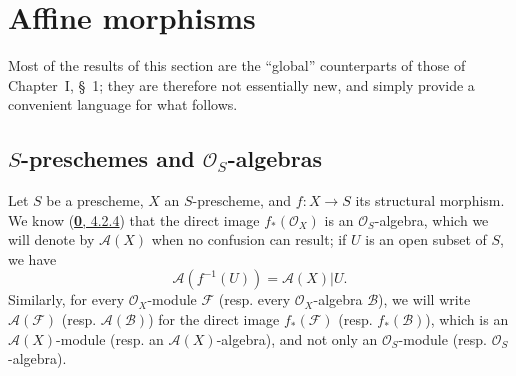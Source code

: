 \section{Affine morphisms}
\label{section:II.1}

Most of the results of this section are the ``global''
counterparts of those of Chapter~I, \S~1; they are
therefore not essentially new, and simply provide a convenient
language for what follows.

\setcounter{subsection}{0}
\subsection{$S$-preschemes and $\mathcal{O}_S$-algebras}
\label{subsection:II.1.1}

\begin{env}[1.1.1]
\label{II.1.1.1}
Let $S$ be a prescheme, $X$ an $S$-prescheme, and $f:X\to S$ its structural
morphism. We know (\hyperref[0.4.2.4]{\textbf{0}, 4.2.4}) that the direct image
$f_*(\mathcal{O}_X)$ is an $\mathcal{O}_S$-algebra, which we
will denote by $\mathcal{A}(X)$ when no confusion can result; if $U$
is an open subset of $S$, we have
\[
  \mathcal{A}(f^{-1}(U))=\mathcal{A}(X)|U.
\]
Similarly, for every $\mathcal{O}_X$-module $\mathcal{F}$ (resp. every
$\mathcal{O}_X$-algebra $\mathcal{B}$), we will write
$\mathcal{A}(\mathcal{F})$ (resp. $\mathcal{A}(\mathcal{B})$) for the direct
image $f_*(\mathcal{F})$ (resp. $f_*(\mathcal{B})$), which is an
$\mathcal{A}(X)$-module (resp. an $\mathcal{A}(X)$-algebra), and not only
an $\mathcal{O}_S$-module (resp. $\mathcal{O}_S$-algebra).
\end{env}


